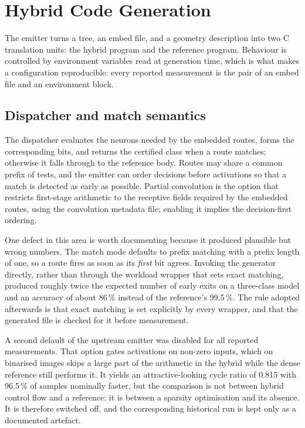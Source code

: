 \section{Hybrid Code Generation}
\label{sec:impl-codegen}

The emitter turns a tree, an embed file, and a geometry description into two C translation units: the hybrid program and the reference program.
Behaviour is controlled by environment variables read at generation time, which is what makes a configuration reproducible: every reported measurement is the pair of an embed file and an environment block.

\subsection{Dispatcher and match semantics}

The dispatcher evaluates the neurons needed by the embedded routes, forms the corresponding bits, and returns the certified class when a route matches; otherwise it falls through to the reference body.
Routes may share a common prefix of tests, and the emitter can order decisions before activations so that a match is detected as early as possible.
Partial convolution is the option that restricts first-stage arithmetic to the receptive fields required by the embedded routes, using the convolution metadata file; enabling it implies the decision-first ordering.

One defect in this area is worth documenting because it produced plausible but wrong numbers.
The match mode defaults to prefix matching with a prefix length of one, so a route fires as soon as its \emph{first} bit agrees.
Invoking the generator directly, rather than through the workload wrapper that sets exact matching, produced roughly twice the expected number of early exits on a three-class model and an accuracy of about 86\,\% instead of the reference's 99.5\,\%.
The rule adopted afterwards is that exact matching is set explicitly by every wrapper, and that the generated file is checked for it before measurement.

A second default of the upstream emitter was disabled for all reported measurements.
That option gates activations on non-zero inputs, which on binarised images skips a large part of the arithmetic in the hybrid while the dense reference still performs it.
It yields an attractive-looking cycle ratio of 0.815 with 96.5\,\% of samples nominally faster, but the comparison is not between hybrid control flow and a reference: it is between a sparsity optimisation and its absence.
It is therefore switched off, and the corresponding historical run is kept only as a documented artefact.

